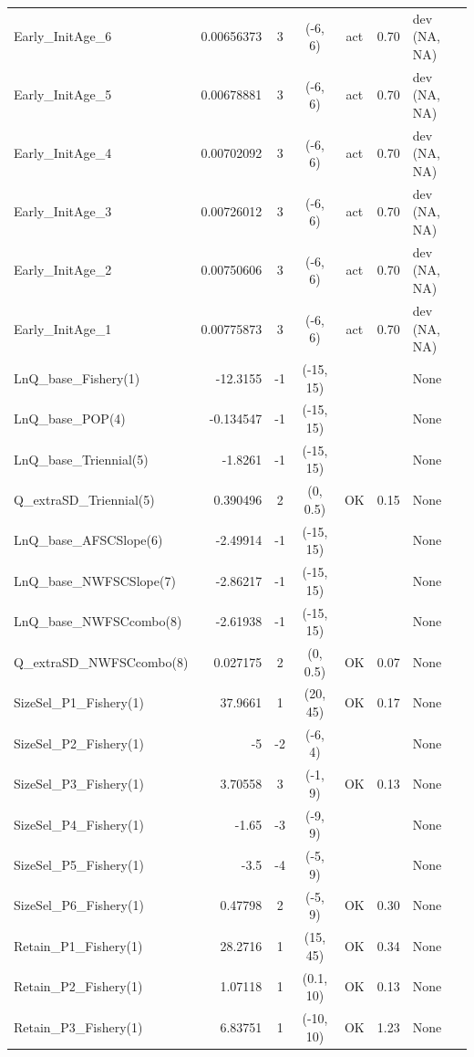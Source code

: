 \documentclass[12pt,]{article}
\begin{document}
\begin{landscape}
\begin{longtable}{lrcccll}
  Early\_InitAge\_6 & 0.00656373 & 3 & (-6, 6) & act & 0.70 & dev (NA, NA) \\ 
  Early\_InitAge\_5 & 0.00678881 & 3 & (-6, 6) & act & 0.70 & dev (NA, NA) \\ 
  Early\_InitAge\_4 & 0.00702092 & 3 & (-6, 6) & act & 0.70 & dev (NA, NA) \\ 
  Early\_InitAge\_3 & 0.00726012 & 3 & (-6, 6) & act & 0.70 & dev (NA, NA) \\ 
  Early\_InitAge\_2 & 0.00750606 & 3 & (-6, 6) & act & 0.70 & dev (NA, NA) \\ 
  Early\_InitAge\_1 & 0.00775873 & 3 & (-6, 6) & act & 0.70 & dev (NA, NA) \\ 
  LnQ\_base\_Fishery(1) & -12.3155 & -1 & (-15, 15) &  &  & None \\ 
  LnQ\_base\_POP(4) & -0.134547 & -1 & (-15, 15) &  &  & None \\ 
  LnQ\_base\_Triennial(5) & -1.8261 & -1 & (-15, 15) &  &  & None \\ 
  Q\_extraSD\_Triennial(5) & 0.390496 & 2 & (0, 0.5) & OK & 0.15 & None \\ 
  LnQ\_base\_AFSCSlope(6) & -2.49914 & -1 & (-15, 15) &  &  & None \\ 
  LnQ\_base\_NWFSCSlope(7) & -2.86217 & -1 & (-15, 15) &  &  & None \\ 
  LnQ\_base\_NWFSCcombo(8) & -2.61938 & -1 & (-15, 15) &  &  & None \\ 
  Q\_extraSD\_NWFSCcombo(8) & 0.027175 & 2 & (0, 0.5) & OK & 0.07 & None \\ 
  SizeSel\_P1\_Fishery(1) & 37.9661 & 1 & (20, 45) & OK & 0.17 & None \\ 
  SizeSel\_P2\_Fishery(1) & -5 & -2 & (-6, 4) &  &  & None \\ 
  SizeSel\_P3\_Fishery(1) & 3.70558 & 3 & (-1, 9) & OK & 0.13 & None \\ 
  SizeSel\_P4\_Fishery(1) & -1.65 & -3 & (-9, 9) &  &  & None \\ 
  SizeSel\_P5\_Fishery(1) & -3.5 & -4 & (-5, 9) &  &  & None \\ 
  SizeSel\_P6\_Fishery(1) & 0.47798 & 2 & (-5, 9) & OK & 0.30 & None \\ 
  Retain\_P1\_Fishery(1) & 28.2716 & 1 & (15, 45) & OK & 0.34 & None \\ 
  Retain\_P2\_Fishery(1) & 1.07118 & 1 & (0.1, 10) & OK & 0.13 & None \\ 
  Retain\_P3\_Fishery(1) & 6.83751 & 1 & (-10, 10) & OK & 1.23 & None \\ 

\end{longtable}
\end{landscape}
\end{document}
